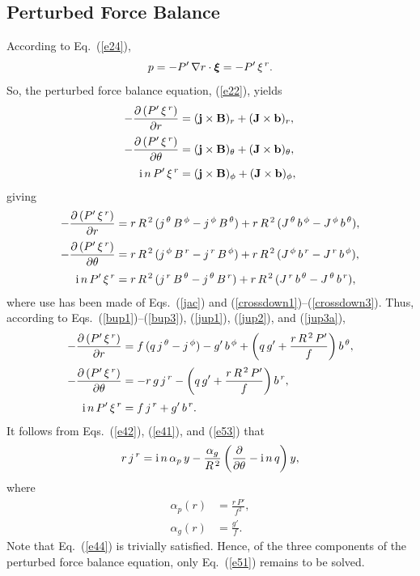 \documentclass[12pt,prb,aps]{revtex4-1}
\newcommand {\bxi}{\mbox{\boldmath$\xi$}}
\begin{document}
\subsection{Perturbed Force Balance}
According to Eq.~(\ref{e24}), 
\begin{equation}
p =-P'\,\nabla r\cdot\bxi=- P'\,\xi^{\,r}.
\end{equation}
So, the perturbed force balance equation, (\ref{e22}), yields
\begin{align}
-\frac{\partial\, (P'\,\xi^{\,r})}{\partial r} &= ({\bf j}\times {\bf B})_r+({\bf J}\times {\bf b})_r,\\[0.5ex]
-\frac{\partial\,(P'\,\xi^{\,r})}{\partial \theta}&= ({\bf j}\times {\bf B})_\theta+({\bf J}\times {\bf b})_\theta,\\[0.5ex]
{\rm i}\,n\,P'\,\xi^{\,r} &= ({\bf j}\times {\bf B})_\phi+({\bf J}\times {\bf b})_\phi,
\end{align}
giving
\begin{align}
-\frac{\partial\, (P'\,\xi^{\,r})}{\partial r} &=r\,R^{\,2}\,(j^{\,\theta}\,B^{\,\phi}-j^{\,\phi}\,B^{\,\theta}) + r\,R^{\,2}\,(J^{\,\theta}\,b^{\,\phi}-J^{\,\phi}\,b^{\,\theta}),\\[0.5ex]
-\frac{\partial\,(P'\,\xi^{\,r})}{\partial \theta}&=r\,R^{\,2}\,(j^{\,\phi}\,B^{\,r}-j^{\,r}\,B^{\,\phi}) + r\,R^{\,2}\,(J^{\,\phi}\,b^{\,r}-J^{\,r}\,b^{\,\phi}),\\[0.5ex]
{\rm i}\,n\,P'\,\xi^{\,r} &=r\,R^{\,2}\,(j^{\,r}\,B^{\,\theta}-j^{\,\theta}\,B^{\,r}) + r\,R^{\,2}\,(J^{\,r}\,b^{\,\theta}-J^{\,\theta}\,b^{\,r}),
\end{align}
where use has been made of Eqs.~(\ref{jac}) and (\ref{crossdown1})--(\ref{crossdown3}). 
Thus, according to Eqs.~(\ref{bup1})--(\ref{bup3}), (\ref{jup1}), (\ref{jup2}), and (\ref{jup3a}), 
\begin{align}
-\frac{\partial\, (P'\,\xi^{\,r})}{\partial r} &= f\,(q\,j^{\,\theta} -j^{\,\phi}) - g'\,b^{\,\phi} + \left(q\,g'+\frac{r\,R^{\,2}\,P'}{f}\right)b^{\,\theta},\label{e51}\\[0.5ex]
-\frac{\partial\,(P'\,\xi^{\,r})}{\partial \theta}&=-r\,g\,j^{\,r} - \left(q\,g'+\frac{r\,R^{\,2}\,P'}{f}\right)b^{\,r},\label{e44}\\[0.5ex]
{\rm i}\,n\,P'\,\xi^{\,r} &= f\,j^{\,r}+g'\,b^{\,r}.\label{e53}
\end{align}
It follows from Eqs.~(\ref{e42}), (\ref{e41}), and (\ref{e53}) that 
\begin{equation}\label{e54}
r\,j^{\,r} = {\rm i}\,n\,\alpha_p\,y - \frac{\alpha_g}{R^{\,2}}\left(\frac{\partial}{\partial\theta}-{\rm i}\,n\,q\right)y,
\end{equation}
where
\begin{align}
\alpha_p(r) &= \frac{r\,P'}{f^2},\label{ap}\\[0.5ex]
\alpha_g (r)&= \frac{g'}{f}.\label{ag}
\end{align}
Note that Eq.~(\ref{e44}) is trivially satisfied. Hence, of the three components of the perturbed force balance equation, only Eq.~(\ref{e51}) remains to be solved. 
\end{document}
